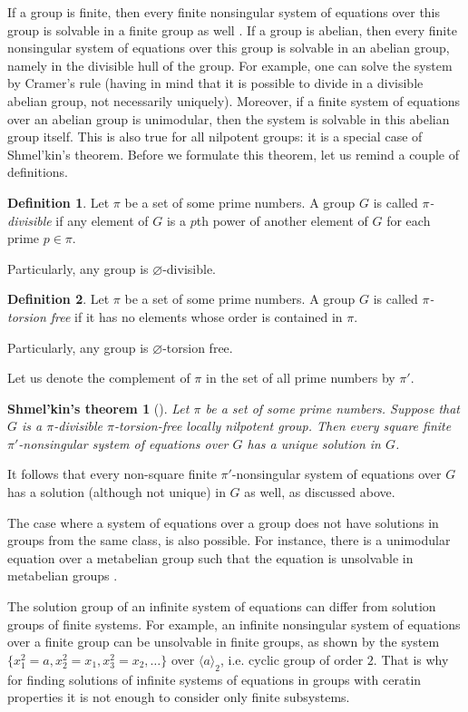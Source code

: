 \documentclass{article}
\newtheorem*{Shmelkintheorem*}{Shmel'kin's theorem}
\theoremstyle{definition}
\newtheorem*{defin}{Definition}
\theoremstyle{remark}
\begin{document}
If a group is finite, then every finite nonsingular system of equations
over this group is solvable in a finite group as well \cite{GR62}.
If a group is abelian, then every finite nonsingular system of equations over this group
is solvable in an abelian group, namely in the divisible hull of the group.
For example, one can solve the system by Cramer's rule
(having in mind that it is possible to divide
in a divisible abelian group, not necessarily uniquely).
Moreover, if a finite system of equations over an abelian group
is unimodular, then the system is solvable in this abelian group itself.
This is also true for all nilpotent groups:
it is a special case of Shmel'kin's theorem.
Before we formulate this theorem, let us remind a couple
of definitions.
\begin{defin}
Let $\pi$ be a set of some prime numbers.
A group $G$ is called {\it $\pi$-divisible}
if any element of $G$ is a $p$th power
of another element of $G$ for each prime $p \in \pi$.

Particularly, any group is $\varnothing$-divisible.
\end{defin}
\begin{defin}
Let $\pi$ be a set of some prime numbers.
A group $G$ is called {\it $\pi$-torsion free}
if it has no elements whose order is contained in $\pi$.

Particularly, any group is $\varnothing$-torsion free.
\end{defin}
Let us denote the complement of $\pi$ in the
set of all prime numbers by $\pi'$.
\begin{Shmelkintheorem*}[\!\!\cite{Sh67}]
Let $\pi$ be a set of some prime numbers.
Suppose that $G$ is a $\pi$-divisible
$\pi$-torsion-free
locally nilpotent group.
Then every square finite $\pi'$-nonsingular system of equations
over $G$ has a unique solution in $G$.
\end{Shmelkintheorem*}

It follows that every non-square finite $\pi'$-nonsingular system
of equations over $G$
has a solution (although not unique) in $G$
as well, as discussed above.

The case where a system of equations over a group
does not have solutions in groups from the same class, is also possible.
For instance, there is a unimodular equation over
a metabelian group such that the equation
is unsolvable in metabelian groups \cite{KMR24}.

The solution group of an infinite system of equations
can differ from solution groups of finite systems.
For example, an infinite nonsingular system of equations
over a finite group can be unsolvable in finite groups,
as shown by the system
$\{x_1^2=a,x_2^2=x_1,x_3^2 = x_2, \ldots \}$ over
$\langle a \rangle_2$, i.e. cyclic group of order $2$.
That is why for finding solutions of infinite
systems of equations in groups with ceratin properties
it is not enough to consider only finite subsystems.
\end{document}
